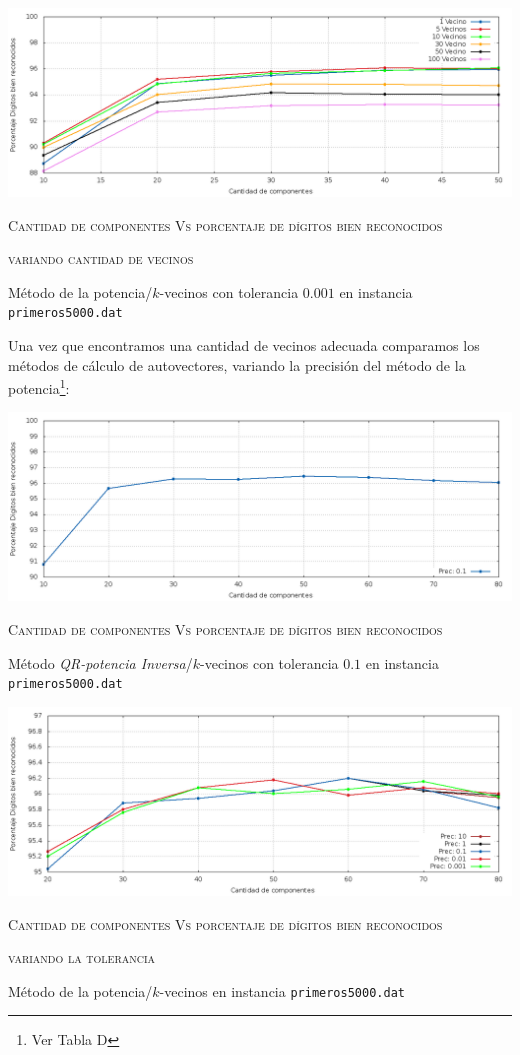 		\vspace{5mm}
		\centerline{\includegraphics[width=20cm]{img/kVecinosPS.png}}
		\centerline{\textsc{Cantidad de componentes Vs porcentaje de d\'igitos bien
		reconocidos}}
		\centerline{\textsc{variando cantidad de vecinos}}
		\centerline{M\'etodo de la potencia/$k$-vecinos con tolerancia $0.001$ en instancia
		\texttt{primeros5000.dat}}
		\vspace{5mm}

		Una vez que encontramos una cantidad de vecinos adecuada comparamos los m\'etodos
		de c\'alculo de autovectores, variando la precisi\'on del m\'etodo de la potencia\footnote{ Ver Tabla D }:

		\vspace{5mm}
		\centerline{\includegraphics[width=20cm]{img/QRkVecinos.png}}
		\centerline{\textsc{Cantidad de componentes Vs porcentaje de d\'igitos bien
		reconocidos}}
		\centerline{M\'etodo \textit{QR-potencia Inversa}/$k$-vecinos con tolerancia $0.1$
		en instancia \texttt{primeros5000.dat}}
		\vspace{5mm}
		
		\vspace{5mm}
		\centerline{\includegraphics[width=20cm]{img/PSprec.png}}
		\centerline{\textsc{Cantidad de componentes Vs porcentaje de d\'igitos bien
		reconocidos}}
		\centerline{\textsc{variando la tolerancia}}
		\centerline{M\'etodo de la potencia/$k$-vecinos en instancia \texttt{primeros5000.dat}}
		\vspace{5mm}

